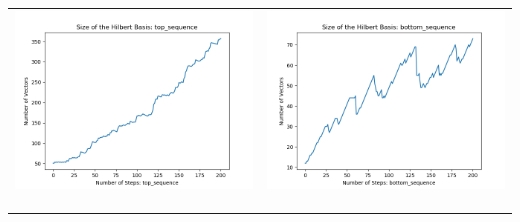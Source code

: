 \documentclass[10pt]{article}
\begin{document}
\begin{tabular}{c|c}
\begin{minipage}{.4\textwidth}
\includegraphics[width=\textwidth]{"DATA/5d/6 generators 2 bound I/top_sequence SIZE"}
\end{minipage} &
\begin{minipage}{.4\textwidth}
\includegraphics[width=\textwidth]{"DATA/5d/6 generators 2 bound I bottomup/bottom_sequence SIZE"}
\end{minipage} \\ \\
\hline \\\begin{minipage}{.4\textwidth}

\end{minipage}
\end{tabular}
\end{document}
